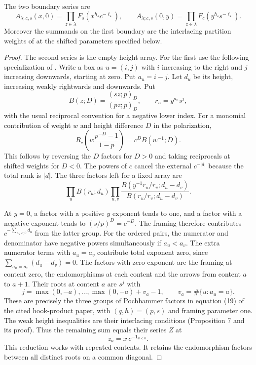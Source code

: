 \begin{lemma}\label{lem:boundary}
The two boundary series are
\[
 A_{\lambda;c,s}(x,0)=\prod_{z\in\lambda}F_s(x^{h_z}c^{-\ell_z}),
 \qquad A_{\lambda;c,s}(0,y)=\prod_{z\in\lambda}F_c(y^{h_z}s^{-\ell_z}).
\]
Moreover the summands on the first boundary are the interlacing
partition weights of \cite[Propositions~6--7]{DS} at the shifted
parameters specified below.
\end{lemma}
\begin{proof}
The second series is the empty height array. For the first use
the following specialization of \cite[Theorem~1]{DS}.
Write a box as $u=(i,j)$ with $i$ increasing to the right and $j$ increasing downwards, starting at zero. Put $a_u=i-j$. Let $d_u$ be its height, increasing weakly rightwards and downwards. Put
\[
 B(z;D)=\frac{(sz;p)_D}{(pz;p)_D},
 \qquad r_u=y^{a_u}s^j ,
\]
with the usual reciprocal convention for a negative lower index. For a monomial contribution of weight $w$ and height difference $D$ in the polarization,
\[
 R_c\!\left(w\frac{p^{-D}-1}{1-p}\right)=c^D B(w^{-1};D).
\]
This follows by reversing the $D$ factors for $D>0$ and taking reciprocals at shifted weights for $D<0$. The powers of $c$ cancel the external $c^{-|d|}$ because the total rank is $|d|$. The three factors left for a fixed array are
\[
 \prod_u B(r_u;d_u)
 \prod_{u,v}
 \frac{B(y^{-1}r_u/r_v;d_u-d_v)}
      {B(r_u/r_v;d_u-d_v)} .
\]


At $y=0$, a factor with a positive $y$ exponent tends to one, and a factor with a negative exponent tends to $(s/p)^D=c^{-D}$. The framing therefore contributes $c^{-\sum_{a_u<0}d_u}$ from the latter group. For the ordered pairs, the numerator and denominator have negative powers simultaneously if $a_u<a_v$. The extra numerator terms with $a_u=a_v$ contribute total exponent zero, since $\sum_{a_u=a_v}(d_u-d_v)=0$. The factors with zero exponent are the framing at content zero, the endomorphisms at each content and the arrows from content $a$ to $a+1$. Their roots at content $a$ are $s^j$ with
\[
 j=\max(0,-a),\ldots,\max(0,-a)+v_a-1,\qquad
 v_a=\#\{u:a_u=a\}.
\]
These are precisely the three groups of Pochhammer factors in equation (19) of the cited hook-product paper, with $(q,\hbar)=(p,s)$ and framing parameter one. The weak height inequalities are their interlacing conditions (Proposition 7 and its proof). Thus the remaining sum equals their series $Z$ at
\[
 z_a=x\,c^{-\mathbf 1_{a<0}} .
\]
This reduction works with repeated contents. It retains the endomorphism factors between all distinct roots on a common diagonal.


\end{proof}

